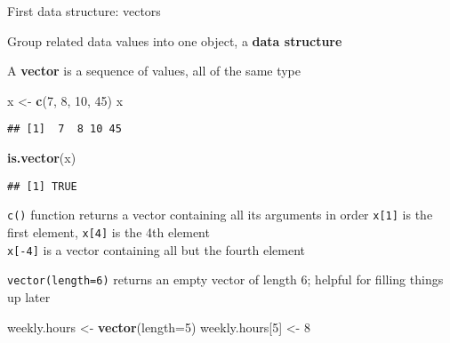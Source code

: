 \documentclass[8pt,ignorenonframetext,]{beamer}
\newenvironment{Shaded}{\begin{snugshade}}{\end{snugshade}}
\newcommand{\KeywordTok}[1]{\textcolor[rgb]{0.13,0.29,0.53}{\textbf{#1}}}
\newcommand{\DataTypeTok}[1]{\textcolor[rgb]{0.13,0.29,0.53}{#1}}
\newcommand{\DecValTok}[1]{\textcolor[rgb]{0.00,0.00,0.81}{#1}}
\newcommand{\StringTok}[1]{\textcolor[rgb]{0.31,0.60,0.02}{#1}}
\newcommand{\NormalTok}[1]{#1}
\begin{document}
\begin{frame}[fragile]{First data structure: vectors}

Group related data values into one object, a \textbf{data structure}

A \textbf{vector} is a sequence of values, all of the same type

\begin{Shaded}
\begin{Highlighting}[]
\NormalTok{x <-}\StringTok{ }\KeywordTok{c}\NormalTok{(}\DecValTok{7}\NormalTok{, }\DecValTok{8}\NormalTok{, }\DecValTok{10}\NormalTok{, }\DecValTok{45}\NormalTok{)}
\NormalTok{x}
\end{Highlighting}
\end{Shaded}

\begin{verbatim}
## [1]  7  8 10 45
\end{verbatim}

\begin{Shaded}
\begin{Highlighting}[]
\KeywordTok{is.vector}\NormalTok{(x)}
\end{Highlighting}
\end{Shaded}

\begin{verbatim}
## [1] TRUE
\end{verbatim}

\texttt{c()} function returns a vector containing all its arguments in
order \texttt{x{[}1{]}} is the first element, \texttt{x{[}4{]}} is the
4th element\\
\texttt{x{[}-4{]}} is a vector containing all but the fourth element

\end{frame}

\begin{frame}[fragile]{}

\texttt{vector(length=6)} returns an empty vector of length 6; helpful
for filling things up later

\begin{Shaded}
\begin{Highlighting}[]
\NormalTok{weekly.hours <-}\StringTok{ }\KeywordTok{vector}\NormalTok{(}\DataTypeTok{length=}\DecValTok{5}\NormalTok{)}
\NormalTok{weekly.hours[}\DecValTok{5}\NormalTok{] <-}\StringTok{ }\DecValTok{8}
\end{Highlighting}
\end{Shaded}

\end{frame}
\end{document}
